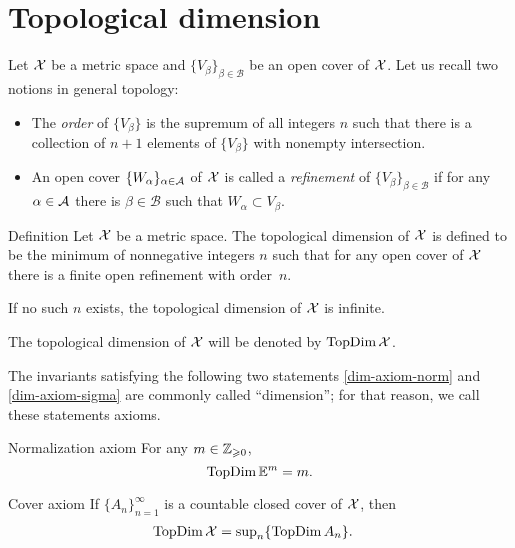 \section{Topological dimension}

Let $\mathcal{X}$ be a metric space and $\{V_\beta\}_{\beta\in\mathcal{B}}$
 be an open cover of $\mathcal{X}$.
Let us recall two notions in general topology:
\begin{itemize}

\item The \emph{order} of $\{V_\beta\}$ is the supremum of all integers $n$ such that there is a collection of $n+1$ elements of $\{V_\beta\}$ with nonempty intersection.

\item An open cover $\{W_\alpha\}_{\alpha\in\mathcal{A}}$ of $\mathcal{X}$ is called a \emph{refinement} of  $\{V_\beta\}_{\beta\in\mathcal{B}}$ if for any $\alpha\in\mathcal{A}$ there is $\beta\in\mathcal{B}$ such that $W_\alpha\subset V_\beta$.

\end{itemize}

\begin{thm}{Definition}\label{def:TopDim}
Let $\mathcal{X}$ be a metric space. 
The topological dimension of $\mathcal{X}$ is defined to be the minimum of nonnegative integers $n$ 
such that for any open cover of $\mathcal{X}$ there is a finite open refinement with order~$n$.

If no such $n$ exists, the topological dimension of $\mathcal{X}$ is infinite.

The topological dimension of $\mathcal{X}$ will be denoted by $\mathop{\rm TopDim}\nolimits\mathcal{X}$.
\end{thm}

The invariants satisfying the following two statements \ref{dim-axiom-norm} and \ref{dim-axiom-sigma} are commonly called ``dimension'';
for that reason, we call these statements axioms.

\begin{thm}{Normalization axiom}
\label{dim-axiom-norm} For any $m\in\mathbb{Z}_{\geqslant0}$,
\[\mathop{\rm TopDim}\nolimits\mathbb{E}^m=m.\]

\end{thm}

\begin{thm}{Cover axiom}\label{dim-axiom-sigma} 
If $\{A_n\}_{n=1}^\infty$ is a countable closed cover of $\mathcal{X}$, then
\begin{align*}
\mathop{\rm TopDim}\nolimits \mathcal{X}&=\sup\nolimits_n\{\mathop{\rm TopDim}\nolimits A_n\}.
\end{align*}

\end{thm}


